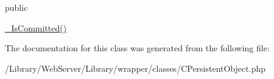 public

\hyperlink{class_c_persistent_object_a6520a7bcecf3f39fd61ec6d08f736e77}{\-\_\-\-Is\-Committed()} 

The documentation for this class was generated from the following file\-:\begin{DoxyCompactItemize}
\item 
/\-Library/\-Web\-Server/\-Library/wrapper/classes/C\-Persistent\-Object.\-php\end{DoxyCompactItemize}
